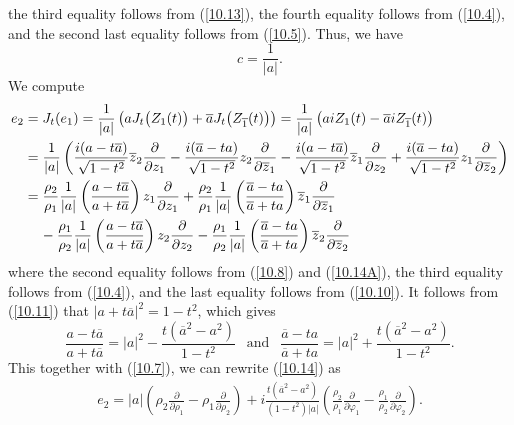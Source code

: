 \documentclass{amsart}
\theoremstyle{Corollary}
\numberwithin{equation}{section}
\begin{document}
the third equality follows from (\ref{10.13}), 
the fourth equality follows from (\ref{10.4}), 
and the second last equality follows from (\ref{10.5}). 
Thus, we have 
\begin{equation}\label{10.14A}
c=\frac{1}{|a|}. 
\end{equation}
We compute 
\begin{equation}\label{10.14}
\begin{split}
e_2&=J_t(e_1)=\frac{1}{|a|}\left(aJ_t\big(Z_1(t)\big) +\overline{a}J_t\big(Z_{\overline{1}}(t)\big)\right)=\frac{1}{|a|}\left(aiZ_1(t)-\overline{a}iZ_{\overline{1}}(t)\right)\\
&=\frac{1}{|a|}\left(\frac{i(a-t\overline{a})}{\sqrt{1-t^2}}\overline{z}_2\frac{\partial}{\partial z_1}-\frac{i(\overline{a}-ta)}{\sqrt{1-t^2}}z_2\frac{\partial}{\partial \overline{z}_1}
-\frac{i(a-t\overline{a})}{\sqrt{1-t^2}}\overline{z}_1\frac{\partial}{\partial z_2}
+\frac{i(\overline{a}-ta)}{\sqrt{1-t^2}}z_1\frac{\partial}{\partial \overline{z}_2}\right)\\
&=\frac{\rho_2}{\rho_1}\frac{1}{|a|}\left(\frac{a-t\overline{a}}{a+t\overline{a}}\right)z_1\frac{\partial}{\partial z_1}
+\frac{\rho_2}{\rho_1}\frac{1}{|a|}\left(\frac{\overline{a}-ta}{\overline{a}+ta}\right)\overline{z}_1\frac{\partial}{\partial 
\overline{z}_1}\\
&\hspace{4mm}
-\frac{\rho_1}{\rho_2}\frac{1}{|a|}\left(\frac{a-t\overline{a}}{a+t\overline{a}}\right)z_2\frac{\partial}{\partial z_2}
-\frac{\rho_1}{\rho_2}\frac{1}{|a|}\left(\frac{\overline{a}-ta}{\overline{a}+ta}\right)\overline{z}_2\frac{\partial}{\partial 
\overline{z}_2}
\end{split}
\end{equation}
where the second equality follows from  (\ref{10.8}) and (\ref{10.14A}), 
the third equality follows from (\ref{10.4}), 
and the  last equality follows from (\ref{10.10}). 
It follows from (\ref{10.11}) that 
$|a+t\overline{a}|^2=1-t^2$, 
which gives 
$$\frac{a-t\overline{a}}{a+t\overline{a}}=|a|^2-\frac{t(\overline{a}^2-a^2)}{1-t^2}~~\mbox{ and }~~
\frac{\overline{a}-ta}{\overline{a}+ta}=|a|^2+\frac{t(\overline{a}^2-a^2)}{1-t^2}.$$
This together with (\ref{10.7}), we can rewrite  (\ref{10.14}) as
\begin{equation}\label{10.15}
\begin{split}
e_2=|a|\left(\rho_2\frac{\partial}{\partial\rho_1}-\rho_1\frac{\partial}{\partial\rho_2}\right)
+i\frac{t(\overline{a}^2-a^2)}{(1-t^2)|a|}
\left(\frac{\rho_2}{\rho_1}\frac{\partial}{\partial\varphi_1}-\frac{\rho_1}{\rho_2}\frac{\partial}{\partial\varphi_2}\right).
\end{split}
\end{equation}
\end{document}
